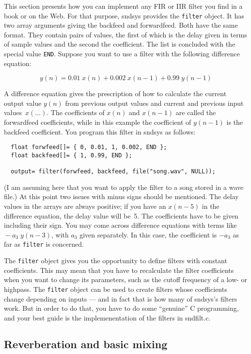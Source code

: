 \documentclass{article}
\def\s{{\sc sndsys} }
\def\sn{{\sc sndsys}}
\def\bv{\begin{verbatim}}
\begin{document}
This section presents how you can implement any FIR or IIR filter you find in a
book or on the Web.  For that purpose, \s provides the {\tt filter} object.  It
has two array arguments giving the backfeed and forwardfeed.  Both have the
same format.  They contain pairs of values, the first of which is the delay
given in terms of sample values and the second the coefficient.  The list is
concluded with the special value {\tt END}.  Suppose you want to use a filter
with the following difference equation:

$$
y(n) = 0.01\; x(n) + 0.002\; x(n-1) + 0.99\; y(n-1)
$$

A difference equation gives the prescription of how to calculate the current
output value $y(n)$ from previous output values and current and previous input
values~$x(\ldots)$.  The coefficients of $x(n)$ and $x(n-1)$ are called the
forwardfeed coefficients, while in this example the coefficient of $y(n-1)$ is
the backfeed coefficient.  You program this filter in \s as follows:

\bv
  float forwfeed[]= { 0, 0.01, 1, 0.002, END };
  float backfeed[]= { 1, 0.99, END };

  output= filter(forwfeed, backfeed, file("song.wav", NULL));
\end{verbatim}

(I am assuming here that you want to apply the filter to a song stored in a
wave file.)  At this point two issues with minus signs should be mentioned.
The delay values in the arrays are always positive; if you have an $x(n-5)$ in
the difference equation, the delay value will be~5.  The coefficients have to
be given including their sign.  You may come across difference equations with
terms like ${}-a_3\; y(n-3)$,  with $a_3$ given separately.  In this case, the
coefficient is $-a_3$ as far as {\tt filter} is concerned.

The {\tt filter} object gives you the opportunity to define filters with
constant coefficients.  This may mean that you have to recalculate the filter
coefficients when you want to change its parameters, such as the cutoff
frequency of a low- or highpass.  The {\tt filter} object can be used to create
filters whose coefficients change depending on inputs --- and in fact that is
how many of \sn's filters work.  But in order to do that, you have to do some
``genuine'' C programming, and your best guide is the implemenentation of the
filters in sndfilt.c.


\subsection{Reverberation and basic mixing}
\label{sec:reverb}
\end{document}
